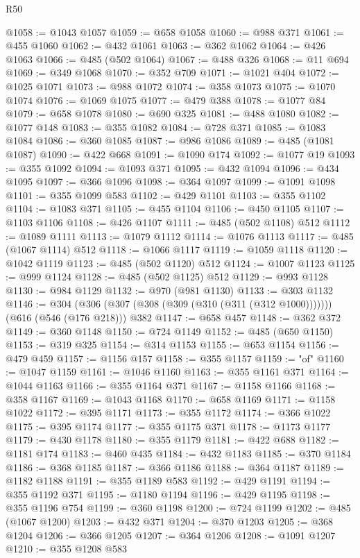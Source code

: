 \begin{lexlean}{R50}
\begin{coremodule}
@1058 := @1043 @1057
@1059 := @658 @1058
@1060 := @988 @371
@1061 := @455 @1060
@1062 := @432 @1061
@1063 := @362 @1062
@1064 := @426 @1063
@1066 := @485 (@502 @1064)
@1067 := @488 @326
@1068 := @11 @694
@1069 := @349 @1068
@1070 := @352 @709
@1071 := @1021 @404
@1072 := @1025 @1071
@1073 := @988 @1072
@1074 := @358 @1073
@1075 := @1070 @1074
@1076 := @1069 @1075
@1077 := @479 @388
@1078 := @1077 @84
@1079 := @658 @1078
@1080 := @690 @325
@1081 := @488 @1080
@1082 := @1077 @148
@1083 := @355 @1082
@1084 := @728 @371
@1085 := @1083 @1084
@1086 := @360 @1085
@1087 := @986 @1086
@1089 := @485 (@1081 @1087)
@1090 := @422 @668
@1091 := @1090 @174
@1092 := @1077 @19
@1093 := @355 @1092
@1094 := @1093 @371
@1095 := @432 @1094
@1096 := @434 @1095
@1097 := @366 @1096
@1098 := @364 @1097
@1099 := @1091 @1098
@1101 := @355 @1099 @583
@1102 := @429 @1101
@1103 := @355 @1102
@1104 := @1083 @371
@1105 := @455 @1104
@1106 := @450 @1105
@1107 := @1103 @1106
@1108 := @426 @1107
@1111 := @485 (@502 @1108) @512
@1112 := @1089 @1111
@1113 := @1079 @1112
@1114 := @1076 @1113
@1117 := @485 (@1067 @1114) @512
@1118 := @1066 @1117
@1119 := @1059 @1118
@1120 := @1042 @1119
@1123 := @485 (@502 @1120) @512
@1124 := @1007 @1123
@1125 := @999 @1124
@1128 := @485 (@502 @1125) @512
@1129 := @993 @1128
@1130 := @984 @1129
@1132 := @970 (@981 @1130)
@1133 := @303 @1132
@1146 := @304 (@306 (@307 (@308 (@309 (@310 (@311 (@312 @1000))))))) (@616 (@546 (@176 @218))) @382
@1147 := @658 @457
@1148 := @362 @372
@1149 := @360 @1148
@1150 := @724 @1149
@1152 := @485 (@650 @1150)
@1153 := @319 @325
@1154 := @314 @1153
@1155 := @653 @1154
@1156 := @479 @459
@1157 := @1156 @157
@1158 := @355 @1157
@1159 := "of"
@1160 := @1047 @1159
@1161 := @1046 @1160
@1163 := @355 @1161 @371
@1164 := @1044 @1163
@1166 := @355 @1164 @371
@1167 := @1158 @1166
@1168 := @358 @1167
@1169 := @1043 @1168
@1170 := @658 @1169
@1171 := @1158 @1022
@1172 := @395 @1171
@1173 := @355 @1172
@1174 := @366 @1022
@1175 := @395 @1174
@1177 := @355 @1175 @371
@1178 := @1173 @1177
@1179 := @430 @1178
@1180 := @355 @1179
@1181 := @422 @688
@1182 := @1181 @174
@1183 := @460 @435
@1184 := @432 @1183
@1185 := @370 @1184
@1186 := @368 @1185
@1187 := @366 @1186
@1188 := @364 @1187
@1189 := @1182 @1188
@1191 := @355 @1189 @583
@1192 := @429 @1191
@1194 := @355 @1192 @371
@1195 := @1180 @1194
@1196 := @429 @1195
@1198 := @355 @1196 @754
@1199 := @360 @1198
@1200 := @724 @1199
@1202 := @485 (@1067 @1200)
@1203 := @432 @371
@1204 := @370 @1203
@1205 := @368 @1204
@1206 := @366 @1205
@1207 := @364 @1206
@1208 := @1091 @1207
@1210 := @355 @1208 @583

\end{coremodule}
\end{lexlean}
